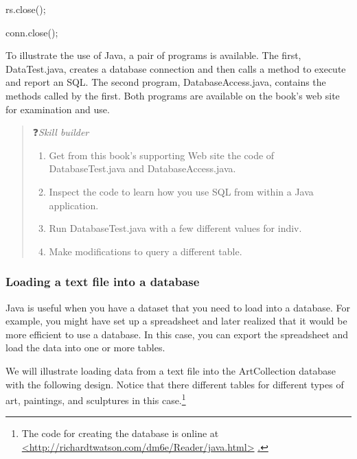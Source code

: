 \documentclass[
]{article}
\begin{document}
rs.close();

conn.close();

To illustrate the use of Java, a pair of programs is available. The
first, DataTest.java, creates a database connection and then calls a
method to execute and report an SQL. The second program,
DatabaseAccess.java, contains the methods called by the first. Both
programs are available on the book's web site for examination and use.

\begin{quote}
❓\emph{Skill builder}

\begin{enumerate}
\def\labelenumi{\arabic{enumi}.}
\item
  Get from this book's supporting Web site the code of
  DatabaseTest.java and DatabaseAccess.java.
\item
  Inspect the code to learn how you use SQL from within a Java
  application.
\item
  Run DatabaseTest.java with a few different values for indiv.
\item
  Make modifications to query a different table.
\end{enumerate}
\end{quote}

\hypertarget{loading-a-text-file-into-a-database}{%
\subsubsection*{Loading a text file into a database}\label{loading-a-text-file-into-a-database}}

Java is useful when you have a dataset that you need to load into a
database. For example, you might have set up a spreadsheet and later
realized that it would be more efficient to use a database. In this
case, you can export the spreadsheet and load the data into one or more
tables.

We will illustrate loading data from a text file into the ArtCollection
database with the following design. Notice that there different tables
for different types of art, paintings, and sculptures in this case.\footnote{The code for creating the database is online at
  \href{http://www.richardtwatson.com/dm6e/Reader/java.html\%5D\%7B.underline\%7D\%5D(http://richardtwatson.com/dm6e/Reader/java.html).}{\textless http://richardtwatson.com/dm6e/Reader/java.html\textgreater{}}
  \href{http://www.richardtwatson.com/dm6e/Reader/java.html\%5D\%7B.underline\%7D\%5D(http://richardtwatson.com/dm6e/Reader/java.html).}{.}}
\end{document}
